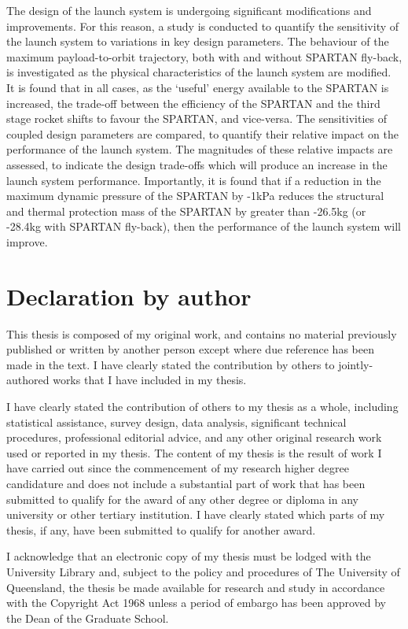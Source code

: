 The design of the launch system is undergoing significant modifications and improvements.
For this reason, a study is conducted to quantify the sensitivity of the launch system to variations in key design parameters. The behaviour of the maximum payload-to-orbit trajectory, both with and without SPARTAN fly-back, is investigated as the physical characteristics of the launch system are modified. 
It is found that in all cases, as the `useful' energy available to the SPARTAN is increased, the trade-off between the efficiency of the SPARTAN and the third stage rocket shifts to favour the SPARTAN, and vice-versa.
The sensitivities of coupled design parameters are compared, to quantify their relative impact on the performance of the launch system. The magnitudes of these relative impacts are assessed, to indicate the design trade-offs which will produce an increase in the launch system performance. Importantly, it is found that if a reduction in the maximum dynamic pressure of the SPARTAN by -1kPa reduces the structural and thermal protection mass of the SPARTAN by greater than -26.5kg (or -28.4kg with SPARTAN fly-back), then the performance of the launch system will improve. 

 

\clearpage
\section*{Declaration by author}

  This thesis is composed of my original work, and contains no material previously published or written by another person except where due reference has been made in the text. I have clearly stated the contribution by others to jointly-authored works that I have included in my thesis.

  I have clearly stated the contribution of others to my thesis as a whole, including statistical assistance, survey design, data analysis, significant technical procedures, professional editorial advice, and any other original research work used or reported in my thesis. The content of my thesis is the result of work I have carried out since the commencement of my research higher degree candidature and does not include a substantial part of work that has been submitted to qualify for the award of any other degree or diploma in any university or other tertiary institution. I have clearly stated which parts of my thesis, if any, have been submitted to qualify for another award.

  I acknowledge that an electronic copy of my thesis must be lodged with the University Library and, subject to the policy and procedures of The University of Queensland, the thesis be made available for research and study in accordance with the Copyright Act 1968 unless a period of embargo has been approved by the Dean of the Graduate School.

